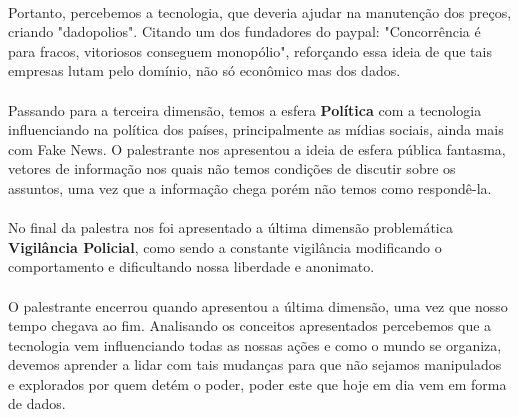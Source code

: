 \documentclass[12pt]{article}
\begin{document}
	\paragraph{}	   	
	   	Portanto, percebemos a tecnologia, que
    	deveria ajudar na manutenção dos preços, criando "dadopolios".
    	Citando um dos fundadores do paypal: "Concorrência é para fracos, 
    	vitoriosos conseguem monopólio", reforçando essa ideia de que tais
    	empresas lutam pelo domínio, não só econômico mas dos dados.
	\paragraph{}
		Passando para a terceira dimensão, temos a esfera \textbf{Política}
   		com a tecnologia influenciando na política dos países, principalmente
    	as mídias sociais, ainda mais com Fake News. O palestrante nos
    	apresentou a ideia de esfera pública fantasma, vetores de informação 
    	nos quais não temos condições de discutir sobre os assuntos, uma vez que
    	a informação chega porém não temos como respondê-la.
	\paragraph{}
		No final da palestra nos foi apresentado a última dimensão problemática
    	\textbf{Vigilância Policial}, como sendo a constante vigilância modificando
    	o comportamento e dificultando nossa liberdade e anonimato.
    \paragraph{}
    	O palestrante encerrou quando apresentou a última dimensão, uma vez que
    	nosso tempo chegava ao fim. Analisando os conceitos apresentados
    	percebemos que a tecnologia vem influenciando todas as nossas ações
    	e como o mundo se organiza, devemos aprender a lidar com tais mudanças
    	para que não sejamos manipulados e explorados por quem detém o poder,
    	poder este que hoje em dia vem em forma de dados.
\end{document}
